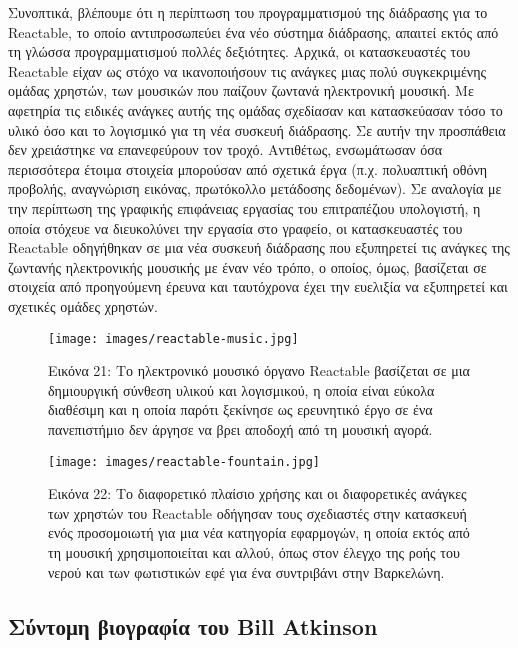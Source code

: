 \documentclass[
]{article}
\begin{document}
Συνοπτικά, βλέπουμε ότι η περίπτωση του προγραμματισμού της διάδρασης
για το Reactable, το οποίο αντιπροσωπεύει ένα νέο σύστημα διάδρασης,
απαιτεί εκτός από τη γλώσσα προγραμματισμού πολλές δεξιότητες. Αρχικά,
οι κατασκευαστές του Reactable είχαν ως στόχο να ικανοποιήσουν τις
ανάγκες μιας πολύ συγκεκριμένης ομάδας χρηστών, των μουσικών που παίζουν
ζωντανά ηλεκτρονική μουσική. Με αφετηρία τις ειδικές ανάγκες αυτής της
ομάδας σχεδίασαν και κατασκεύασαν τόσο το υλικό όσο και το λογισμικό για
τη νέα συσκευή διάδρασης. Σε αυτήν την προσπάθεια δεν χρειάστηκε να
επανεφεύρουν τον τροχό. Αντιθέτως, ενσωμάτωσαν όσα περισσότερα έτοιμα
στοιχεία μπορούσαν από σχετικά έργα (π.χ. πολυαπτική οθόνη προβολής,
αναγνώριση εικόνας, πρωτόκολλο μετάδοσης δεδομένων). Σε αναλογία με την
περίπτωση της γραφικής επιφάνειας εργασίας του επιτραπέζιου υπολογιστή,
η οποία στόχευε να διευκολύνει την εργασία στο γραφείο, οι κατασκευαστές
του Reactable οδηγήθηκαν σε μια νέα συσκευή διάδρασης που εξυπηρετεί τις
ανάγκες της ζωντανής ηλεκτρονικής μουσικής με έναν νέο τρόπο, ο οποίος,
όμως, βασίζεται σε στοιχεία από προηγούμενη έρευνα και ταυτόχρονα έχει
την ευελιξία να εξυπηρετεί και σχετικές ομάδες χρηστών.

\leavevmode{}%
\begin{figure}
\hypertarget{fig:reactable-music}{%
\centering
\texttt{[image: images/reactable-music.jpg]}
\caption{Εικόνα 21: Το ηλεκτρονικό μουσικό όργανο Reactable βασίζεται σε
μια δημιουργική σύνθεση υλικού και λογισμικού, η οποία είναι εύκολα
διαθέσιμη και η οποία παρότι ξεκίνησε ως ερευνητικό έργο σε ένα
πανεπιστήμιο δεν άργησε να βρει αποδοχή από τη μουσική
αγορά.}\label{fig:reactable-music}
}
\end{figure}

\leavevmode{}%
\begin{figure}
\hypertarget{fig:reactable-fountain}{%
\centering
\texttt{[image: images/reactable-fountain.jpg]}
\caption{Εικόνα 22: Το διαφορετικό πλαίσιο χρήσης και οι διαφορετικές
ανάγκες των χρηστών του Reactable οδήγησαν τους σχεδιαστές στην
κατασκευή ενός προσομοιωτή για μια νέα κατηγορία εφαρμογών, η οποία
εκτός από τη μουσική χρησιμοποιείται και αλλού, όπως στον έλεγχο της
ροής του νερού και των φωτιστικών εφέ για ένα συντριβάνι στην
Βαρκελώνη.}\label{fig:reactable-fountain}
}
\end{figure}

\hypertarget{ux3c3ux3cdux3bdux3c4ux3bfux3bcux3b7-ux3b2ux3b9ux3bfux3b3ux3c1ux3b1ux3c6ux3afux3b1-ux3c4ux3bfux3c5-bill-atkinson}{%
\subsection{Σύντομη βιογραφία του Bill
Atkinson}\label{ux3c3ux3cdux3bdux3c4ux3bfux3bcux3b7-ux3b2ux3b9ux3bfux3b3ux3c1ux3b1ux3c6ux3afux3b1-ux3c4ux3bfux3c5-bill-atkinson}}
\end{document}
